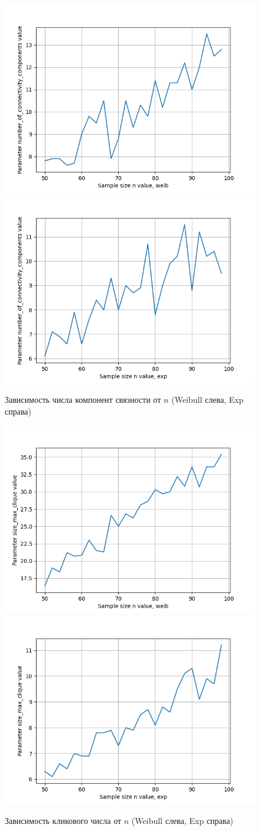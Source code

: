 \documentclass{HSEtitle}
\begin{document}
\begin{figure}[H]
    \centering
    \includegraphics[width=0.45\linewidth]{weib_n_knn.png}
    \hfill
    \includegraphics[width=0.45\linewidth]{exp_n_knn.png}
    \caption{Зависимость числа компонент связности от $n$ (Weibull слева, Exp справа)}
    \label{fig:weib_exp_n_knn}
\end{figure}

\begin{figure}[H]
    \centering
    \includegraphics[width=0.45\linewidth]{weib_n.png}
    \hfill
    \includegraphics[width=0.45\linewidth]{exp_n.png}
    \caption{Зависимость кликового числа от $n$ (Weibull слева, Exp справа)}
    \label{fig:weib_exp_n}
\end{figure}
\end{document}
